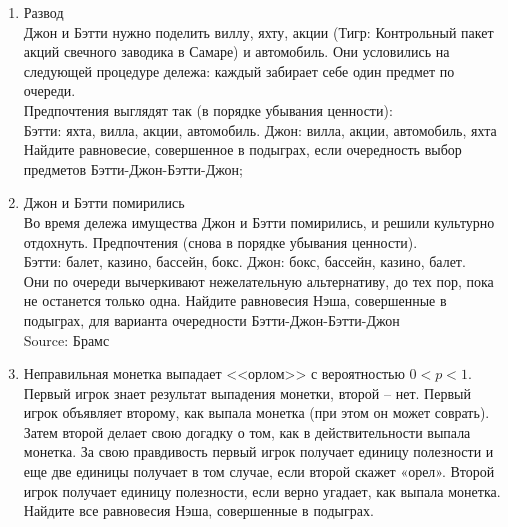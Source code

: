 \documentclass[pdftex,12pt,a4paper]{article}
\begin{document}
\begin{enumerate}
\item Развод \\
Джон и Бэтти нужно поделить виллу, яхту, акции (Тигр: Контрольный пакет акций свечного заводика в Самаре) и автомобиль. Они условились на следующей процедуре дележа: каждый забирает себе один предмет по очереди.\\
Предпочтения выглядят так (в порядке убывания ценности):\\
Бэтти: яхта, вилла, акции, автомобиль. Джон: вилла, акции, автомобиль, яхта\\
Найдите равновесие, совершенное в подыграх, если очередность выбор предметов Бэтти-Джон-Бэтти-Джон;

\item Джон и Бэтти помирились \\
Во время дележа имущества Джон и Бэтти помирились, и решили культурно отдохнуть. Предпочтения (снова в порядке убывания ценности).\\
Бэтти: балет, казино, бассейн, бокс. Джон: бокс, бассейн, казино, балет.\\
Они по очереди вычеркивают нежелательную альтернативу, до тех пор, пока не останется только одна. Найдите равновесия Нэша, совершенные в подыграх, для варианта очередности Бэтти-Джон-Бэтти-Джон\\
Source: Брамс 

\item 
Неправильная монетка выпадает <<орлом>> с вероятностью $0<p<1$. Первый игрок знает результат выпадения монетки, второй – нет. Первый игрок объявляет второму, как выпала монетка (при этом он может соврать). Затем второй делает свою догадку о том, как в действительности выпала монетка. За свою правдивость первый игрок получает единицу полезности и еще две единицы получает в том случае, если второй скажет «орел». Второй игрок получает единицу полезности, если верно угадает, как выпала монетка. Найдите все равновесия Нэша, совершенные в подыграх.


\end{enumerate}
\end{document}
